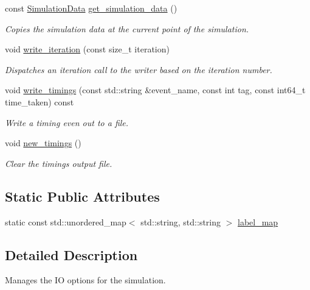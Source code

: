 \begin{DoxyCompactItemize}
const \mbox{\hyperlink{structwash_1_1io_1_1SimulationData}{Simulation\+Data}} \mbox{\hyperlink{classwash_1_1io_1_1IOManager_acd4d5358ca4bb964926dfc080a72475c}{get\+\_\+simulation\+\_\+data}} ()
\begin{DoxyCompactList}\small\item\em Copies the simulation data at the current point of the simulation. \end{DoxyCompactList}\item 
void \mbox{\hyperlink{classwash_1_1io_1_1IOManager_ab4670696bfb277a364f6112fc6f0d051}{write\+\_\+iteration}} (const size\+\_\+t iteration)
\begin{DoxyCompactList}\small\item\em Dispatches an iteration call to the writer based on the iteration number. \end{DoxyCompactList}\item 
void \mbox{\hyperlink{classwash_1_1io_1_1IOManager_ab2397361f7dc4f7b54b559d332bafb11}{write\+\_\+timings}} (const std\+::string \&event\+\_\+name, const int tag, const int64\+\_\+t time\+\_\+taken) const
\begin{DoxyCompactList}\small\item\em Write a timing even out to a file. \end{DoxyCompactList}\item 
void \mbox{\hyperlink{classwash_1_1io_1_1IOManager_ae23d3d68354b0ba5b410992c60fe6762}{new\+\_\+timings}} ()
\begin{DoxyCompactList}\small\item\em Clear the timings output file. \end{DoxyCompactList}\end{DoxyCompactItemize}
\subsection*{Static Public Attributes}
\begin{DoxyCompactItemize}
\item 
static const std\+::unordered\+\_\+map$<$ std\+::string, std\+::string $>$ \mbox{\hyperlink{classwash_1_1io_1_1IOManager_ae2918fb006b6571b0eeceed90d2685b4}{label\+\_\+map}}
\end{DoxyCompactItemize}


\subsection{Detailed Description}
Manages the IO options for the simulation. 

